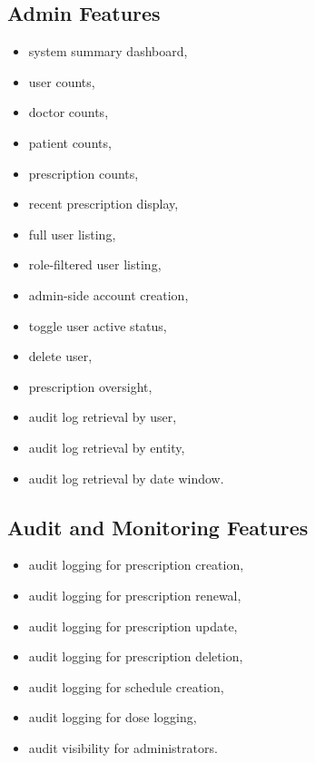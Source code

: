 \documentclass[12pt,a4paper]{article}
\begin{document}
\subsection{Admin Features}
\begin{itemize}[leftmargin=*]
  \item system summary dashboard,
  \item user counts,
  \item doctor counts,
  \item patient counts,
  \item prescription counts,
  \item recent prescription display,
  \item full user listing,
  \item role-filtered user listing,
  \item admin-side account creation,
  \item toggle user active status,
  \item delete user,
  \item prescription oversight,
  \item audit log retrieval by user,
  \item audit log retrieval by entity,
  \item audit log retrieval by date window.
\end{itemize}

\subsection{Audit and Monitoring Features}
\begin{itemize}[leftmargin=*]
  \item audit logging for prescription creation,
  \item audit logging for prescription renewal,
  \item audit logging for prescription update,
  \item audit logging for prescription deletion,
  \item audit logging for schedule creation,
  \item audit logging for dose logging,
  \item audit visibility for administrators.
\end{itemize}
\end{document}
